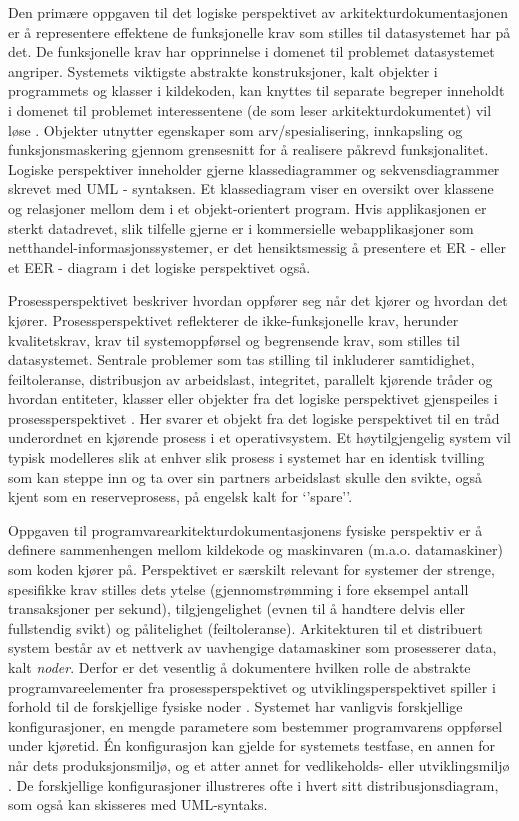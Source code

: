 Den primære oppgaven til det logiske perspektivet av arkitekturdokumentasjonen er å representere effektene de funksjonelle krav som stilles til datasystemet har på det. De funksjonelle krav har opprinnelse i domenet til problemet datasystemet angriper. Systemets viktigste abstrakte konstruksjoner, kalt objekter i programmets og klasser i kildekoden, kan knyttes til separate begreper inneholdt i domenet til problemet interessentene (de som leser arkitekturdokumentet) vil løse \citep{kruchten1995}. Objekter utnytter egenskaper som arv/spesialisering, innkapsling og funksjonsmaskering gjennom grensesnitt for å realisere påkrevd funksjonalitet. Logiske perspektiver inneholder gjerne klassediagrammer og sekvensdiagrammer skrevet med UML - syntaksen. Et klassediagram viser en oversikt over klassene og relasjoner mellom dem i et objekt-orientert program. Hvis applikasjonen er sterkt datadrevet, slik tilfelle gjerne er i kommersielle webapplikasjoner som netthandel-informasjonssystemer, er det hensiktsmessig å presentere et ER -  eller et EER - diagram i det logiske perspektivet også.

Prosessperspektivet beskriver hvordan oppfører seg når det kjører og hvordan det kjører. Prosessperspektivet reflekterer de ikke-funksjonelle krav, herunder kvalitetskrav, krav til systemoppførsel og begrensende krav, som stilles til datasystemet. Sentrale problemer som tas stilling til inkluderer samtidighet, feiltoleranse, distribusjon av arbeidslast, integritet, parallelt kjørende tråder og hvordan entiteter, klasser eller objekter fra det logiske perspektivet gjenspeiles i prosessperspektivet \citep{kruchten1995}. Her svarer et objekt fra det logiske perspektivet til en tråd underordnet en kjørende prosess i et operativsystem. Et høytilgjengelig system vil typisk modelleres slik at enhver slik prosess i systemet har en identisk tvilling som kan steppe inn og ta over sin partners arbeidslast skulle den svikte, også kjent som en reserveprosess, på engelsk kalt for ‘’spare’’.

Oppgaven til programvarearkitekturdokumentasjonens fysiske perspektiv er å definere sammenhengen mellom kildekode og maskinvaren (m.a.o. datamaskiner) som koden kjører på. Perspektivet er særskilt relevant for systemer der strenge, spesifikke krav stilles dets ytelse (gjennomstrømming i fore eksempel antall transaksjoner per sekund), tilgjengelighet (evnen til å handtere delvis eller fullstendig svikt) og pålitelighet (feiltoleranse). Arkitekturen til et distribuert system består av et nettverk av uavhengige datamaskiner som prosesserer data, kalt \emph{noder}. Derfor er det vesentlig å dokumentere hvilken rolle de abstrakte programvareelementer fra prosessperspektivet og utviklingsperspektivet spiller i forhold til de forskjellige fysiske noder \citep{kruchten1995}. Systemet har vanligvis forskjellige konfigurasjoner, en mengde parametere som bestemmer programvarens oppførsel under kjøretid. Én konfigurasjon kan gjelde for systemets testfase, en annen for når dets produksjonsmiljø, og et atter annet for vedlikeholds- eller utviklingsmiljø \citep{kruchten1995}. De forskjellige konfigurasjoner illustreres ofte i hvert sitt distribusjonsdiagram, som også kan skisseres med UML-syntaks.


